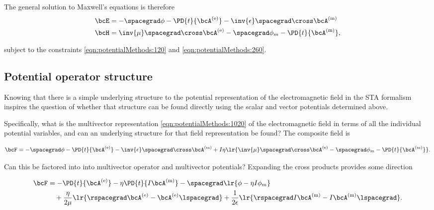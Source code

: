 The general solution to Maxwell's equations is therefore
\begin{dmath}\label{eqn:potentialMethods:280}
\begin{aligned}
\bcE &=
-\spacegrad \phi -\PD{t}{ \bcA^\e }
- \inv{\epsilon} \spacegrad \cross \bcA^\m \\
\bcH &=
\inv{\mu} \spacegrad \cross \bcA^\e
-\spacegrad \phi_m - \PD{t}{\bcA^\m},
\end{aligned}
\end{dmath}

subject to the constraints \cref{eqn:potentialMethods:120} and \cref{eqn:potentialMethods:260}.

\subsection{Potential operator structure}

Knowing that there is a simple underlying structure to the potential representation of the electromagnetic field in the STA formalism inspires the question of whether that structure can be found directly using the scalar and vector potentials determined above.

Specifically, what is the multivector representation \cref{eqn:potentialMethods:1020} of the electromagnetic field in terms of all the individual potential variables, and can an underlying structure for that field representation be found?  The composite field is

\begin{dmath}\label{eqn:potentialMethods:280b}
\bcF
=
-\spacegrad \phi -\PD{t}{ \bcA^\e }
- \inv{\epsilon} \spacegrad \cross \bcA^\m \\
+ I \eta
\lr{
\inv{\mu} \spacegrad \cross \bcA^\e
-\spacegrad \phi_m - \PD{t}{\bcA^\m}
}.
\end{dmath}

Can this be factored into into multivector operator and multivector potentials?  Expanding the cross products provides some direction

\begin{dmath}\label{eqn:potentialMethods:1040}
\begin{aligned}
\bcF
&=
- \PD{t}{ \bcA^\e }
- \eta \PD{t}{I \bcA^\m}
- \spacegrad \lr{ \phi - \eta I \phi_m } \\
&\quad + \frac{\eta}{2 \mu} \lr{ \rspacegrad \bcA^\e - \bcA^\e \lspacegrad }
+ \frac{1}{2 \epsilon} \lr{ \rspacegrad I \bcA^\m - I \bcA^\m \lspacegrad }.
\end{aligned}
\end{dmath}

